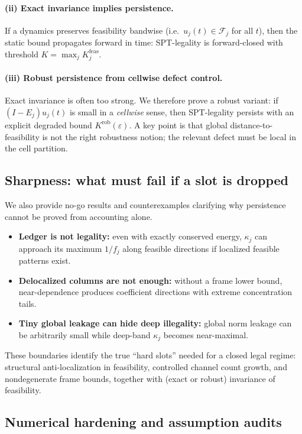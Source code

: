 \documentclass[11pt]{article}
\begin{document}
\paragraph{(ii) Exact invariance implies persistence.}
If a dynamics preserves feasibility bandwise (i.e.\ $u_j(t)\in\mathcal F_j$ for all $t$), then the static bound propagates forward in time: SPT-legality is forward-closed with threshold $K=\max_j K^{\mathrm{feas}}_j$.

\paragraph{(iii) Robust persistence from cellwise defect control.}
Exact invariance is often too strong.
We therefore prove a robust variant: if $(I-E_j)u_j(t)$ is small in a \emph{cellwise} sense, then SPT-legality persists with an explicit degraded bound $K^{\mathrm{rob}}(\varepsilon)$.
A key point is that global distance-to-feasibility is not the right robustness notion; the relevant defect must be local in the cell partition.

\subsection{Sharpness: what must fail if a slot is dropped}

We also provide no-go results and counterexamples clarifying why persistence cannot be proved from accounting alone.

\begin{itemize}
\item \textbf{Ledger is not legality:} even with exactly conserved energy, $\kappa_j$ can approach its maximum $1/f_j$ along feasible directions if localized feasible patterns exist.
\item \textbf{Delocalized columns are not enough:} without a frame lower bound, near-dependence produces coefficient directions with extreme concentration tails.
\item \textbf{Tiny global leakage can hide deep illegality:} global norm leakage can be arbitrarily small while deep-band $\kappa_j$ becomes near-maximal.
\end{itemize}

These boundaries identify the true ``hard slots'' needed for a closed legal regime: structural anti-localization in feasibility, controlled channel count growth, and nondegenerate frame bounds, together with (exact or robust) invariance of feasibility.

\subsection{Numerical hardening and assumption audits}
\end{document}
